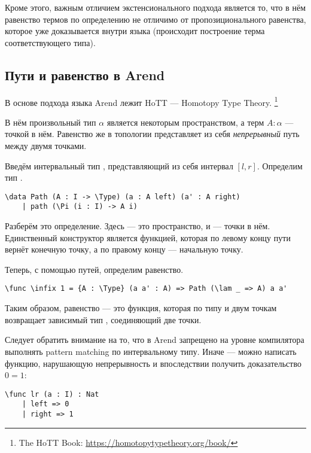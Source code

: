 Кроме этого, важным отличием экстенсионального подхода является то, что в нём равенство термов по определению
не отличимо от пропозиционального равенства, которое уже доказывается внутри языка (происходит построение терма соответствующего типа).

\subsection{Пути и равенство в Arend}
В основе подхода языка Arend лежит HoTT --- Homotopy Type Theory. \footnote{The HoTT Book: \url{https://homotopytypetheory.org/book/}}

В нём произвольный тип $\alpha$ является некоторым пространством, а терм $A : \alpha$ --- точкой в нём.
Равенство же в топологии представляет из себя \textit{непрерывный} путь между двумя точками.

Введём интервальный тип , представляющий из себя интервал $[l, r]$.
Определим тип .

\begin{verbatim}
\data Path (A : I -> \Type) (a : A left) (a' : A right)
    | path (\Pi (i : I) -> A i)
\end{verbatim} 

Разберём это определение. Здесь  --- это пространство,  и  --- точки в нём.
Единственный конструктор является функцией, которая по левому концу пути вернёт конечную точку, а по правому концу --- начальную точку.

Теперь, с помощью путей, определим равенство.

\begin{verbatim}
\func \infix 1 = {A : \Type} (a a' : A) => Path (\lam _ => A) a a'
\end{verbatim}

Таким образом, равенство --- это функция, которая по типу и двум точкам возвращает
зависимый тип , соединяющий две точки.

Следует обратить внимание на то, что в Arend запрещено на уровне компилятора выполнять
pattern matching по интервальному типу.
Иначе --- можно написать функцию, нарушающую непрерывность и впоследствии получить доказательство $0 = 1$:

\begin{verbatim}
\func lr (a : I) : Nat
    | left => 0
    | right => 1
\end{verbatim}

